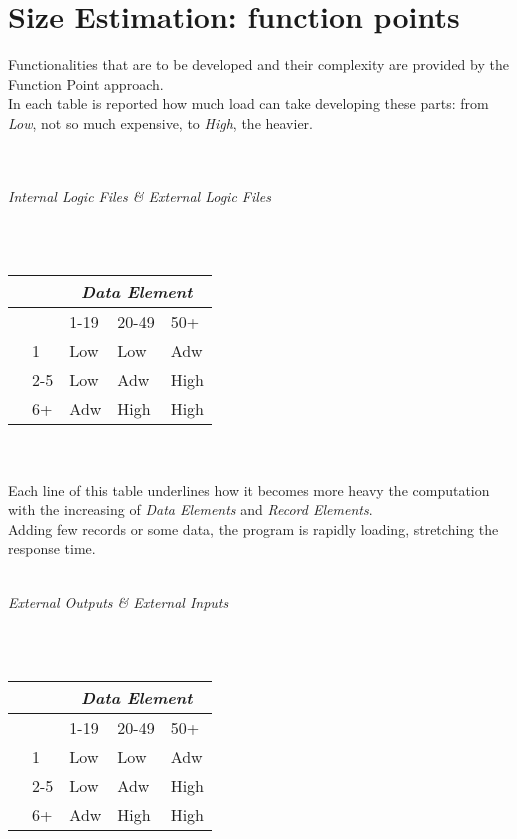\documentclass[11pt,a4paper]{report}
\begin{document}
\section{Size Estimation: function points}
Functionalities that are to be developed and their complexity are provided by the Function Point approach.\\In each table is reported how much load can take developing these parts: from \textit{Low}, not so much expensive, to \textit{High}, the heavier.\\
\\\\
\centerline{\textit{Internal Logic Files \& External Logic Files}}
\\\\
\begin{tabularx}{\textwidth}{|p{1cm}|X|X|X|X|}
	\hline
	\multicolumn{2}{|X|}{} & \multicolumn{3}{c|}{\textit{Data Element}}\\
	\hline
 	 \multirow{1}{*}{}& & 1-19 & 20-49 & 50+\\ \cline{2-5}	
	 \multirow{3}{*}{\rotatebox[origin=c]{90}{\parbox{10mm}{Record\\Elements}}}  & 1 & Low & Low & Adw\\
	 & 2-5 & Low & Adw & High\\
	 & 6+ & Adw & High & High\\
	\hline
\end{tabularx}
\\\\
Each line of this table underlines how it becomes more heavy the computation with the increasing of \textit{Data Elements} and \textit{Record Elements}.\\
Adding few records or some data, the program is rapidly loading, stretching the response time.
\\\\
\centerline{\textit{External Outputs \& External Inputs}}
\\\\
\begin{tabularx}{\textwidth}{|p{1cm}|X|X|X|X|}
	\hline
	\multicolumn{2}{|X|}{} & \multicolumn{3}{c|}{\textit{Data Element}}\\
	\hline
	\multirow{1}{*}{}& & 1-19 & 20-49 & 50+\\ \cline{2-5}	
	\multirow{3}{*}{\rotatebox[origin=c]{90}{\parbox{10mm}{Record\\Elements}}}  & 1 & Low & Low & Adw\\
	& 2-5 & Low & Adw & High\\
	& 6+ & Adw & High & High\\
	\hline
\end{tabularx}
\end{document}
